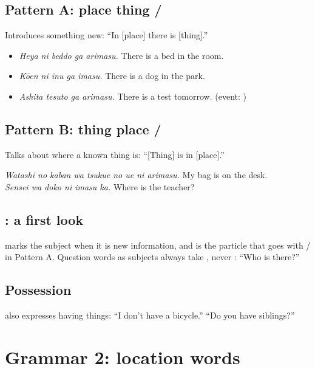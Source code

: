 \subsection{Pattern A: place  thing  /}
Introduces something new: ``In [place] there is [thing].''
\begin{example}
\leavevmode
\begin{itemize}
  \item {} \emph{Heya ni beddo ga arimasu.}
        There is a bed in the room.
  \item {} \emph{Kōen ni inu ga imasu.}
        There is a dog in the park.
  \item {} \emph{Ashita tesuto ga arimasu.}
        There is a test tomorrow. (event: )
\end{itemize}
\end{example}

\subsection{Pattern B: thing  place  /}
Talks about where a known thing is: ``[Thing] is in [place].''
\begin{example}
\emph{Watashi no kaban wa tsukue no ue ni arimasu.} My bag is on the desk.\\
 \emph{Sensei wa doko ni imasu ka.} Where is the teacher?
\end{example}

\subsection{: a first look}
 marks the subject when it is new information, and is the particle that goes with
/ in Pattern A. Question words as subjects always take ,
never :  ``Who is there?''

\subsection{Possession}
 also expresses having things:
 ``I don't have a bicycle.''
 ``Do you have siblings?''

\section{Grammar 2: location words}


